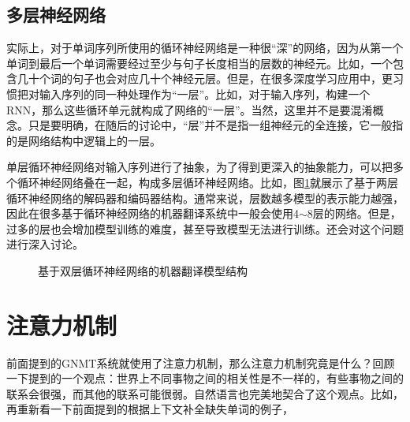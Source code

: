
\subsection{多层神经网络}

\parinterval 实际上，对于单词序列所使用的循环神经网络是一种很“深”的网络，因为从第一个单词到最后一个单词需要经过至少与句子长度相当的层数的神经元。比如，一个包含几十个词的句子也会对应几十个神经元层。但是，在很多深度学习应用中，更习惯把对输入序列的同一种处理作为“一层”。比如，对于输入序列，构建一个RNN，那么这些循环单元就构成了网络的“一层”。当然，这里并不是要混淆概念。只是要明确，在随后的讨论中，“层”并不是指一组神经元的全连接，它一般指的是网络结构中逻辑上的一层。

\parinterval 单层循环神经网络对输入序列进行了抽象，为了得到更深入的抽象能力，可以把多个循环神经网络叠在一起，构成多层循环神经网络。比如，图\ref{fig:10-15}就展示了基于两层循环神经网络的解码器和编码器结构。通常来说，层数越多模型的表示能力越强，因此在很多基于循环神经网络的机器翻译系统中一般会使用4$\sim$8层的网络。但是，过多的层也会增加模型训练的难度，甚至导致模型无法进行训练。{\chapterthirteen}还会对这个问题进行深入讨论。

\begin{figure}[htp]
\centering
 \hspace{10em}
\caption{基于双层循环神经网络的机器翻译模型结构}
\label{fig:10-15}
\end{figure}

\sectionnewpage
\section{注意力机制}
\label{sec:10.4}

\parinterval 前面提到的GNMT系统就使用了注意力机制，那么注意力机制究竟是什么？回顾一下{\chaptertwo}提到的一个观点：世界上不同事物之间的相关性是不一样的，有些事物之间的联系会很强，而其他的联系可能很弱。自然语言也完美地契合了这个观点。比如，再重新看一下前面提到的根据上下文补全缺失单词的例子，

